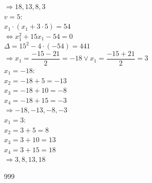 \documentclass[a4paper]{article}
\begin{document}
$\Rightarrow 18, 13, 8, 3$ \\

$v = 5$: \\

$x_1\cdot (x_1 + 3\cdot5) = 54$ \\

$\Leftrightarrow x_1^2 + 15x_1 - 54 = 0$ \\

$\Delta = 15^2-4\cdot(-54) = 441$ \\

$\Rightarrow x_1 = \dfrac{-15 - 21}{2} = -18 \vee x_1 = \dfrac{-15 + 21}{2} = 3$ \\

$x_1 = -18$: \\

$x_2 = -18 + 5 = -13$ \\

$x_3 = -18 + 10 = -8$ \\

$x_4 = -18 + 15 = -3$ \\

$\Rightarrow -18 , -13, -8, -3$ \\

$x_1 = 3$: \\

$x_2 = 3 + 5 = 8$ \\

$x_3 = 3 + 10 = 13$ \\

$x_4 = 3 + 15 = 18$ \\

$\Rightarrow 3, 8, 13, 18$ \\





\begin{thebibliography}{999}
\end{thebibliography}
\end{document}
